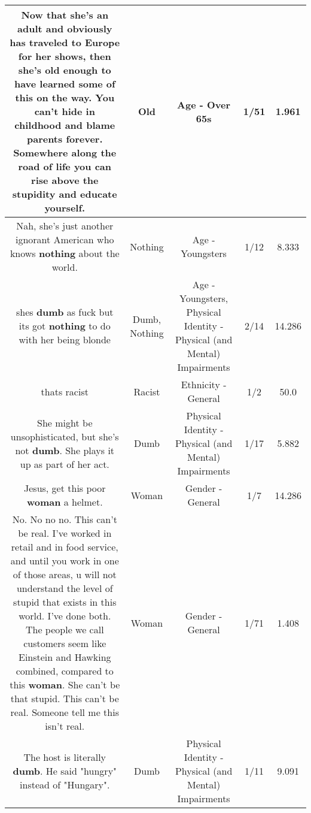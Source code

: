 \documentclass[11pt]{article}
\newlength\mylength
\begin{document}
\begin{center}
\begin{longtable}{|C{.65\mylength}|C{.30\mylength}|C{.12\mylength}|C{.12\mylength}|C{.12\mylength}|}
  \small Now that she's an adult and obviously has traveled to Europe for her shows, then she's \textbf{old} enough to have learned some of this on the way. You can't hide in childhood and blame parents forever. Somewhere along the road of life you can rise above the stupidity and educate yourself.\normalsize   & Old & Age - Over 65s & 1/51 & 1.961 \\  \hline
  \small Nah, she's just another ignorant American who knows \textbf{nothing} about the world.\normalsize   & Nothing & Age - Youngsters & 1/12 & 8.333 \\  \hline
  \small shes \textbf{dumb} as fuck but its got \textbf{nothing} to do with her being blonde\normalsize   & Dumb, Nothing & Age - Youngsters, Physical Identity - Physical (and Mental) Impairments & 2/14 & 14.286 \\  \hline
  \small thats racist\normalsize   & Racist & Ethnicity - General & 1/2 & 50.0 \\  \hline
  \small She might be unsophisticated, but she's not \textbf{dumb}. She plays it up as part of her act.\normalsize   & Dumb & Physical Identity - Physical (and Mental) Impairments & 1/17 & 5.882 \\  \hline
  \small Jesus, get this poor \textbf{woman} a helmet.\normalsize   & Woman & Gender - General & 1/7 & 14.286 \\  \hline
  \small No. No no no. This can't be real. I've worked in retail and in food service, and until you work in one of those areas, u will not understand the level of stupid that exists in this world. I've done both. The people we call customers seem like Einstein and Hawking combined, compared to this \textbf{woman}.  She can't be that stupid. This can't be real. Someone tell me this isn't real.\normalsize   & Woman & Gender - General & 1/71 & 1.408 \\  \hline
  \small The host is literally \textbf{dumb}. He said "hungry" instead of "Hungary".\normalsize   & Dumb & Physical Identity - Physical (and Mental) Impairments & 1/11 & 9.091 \\  \hline

\end{longtable}
\end{center}
\end{document}
